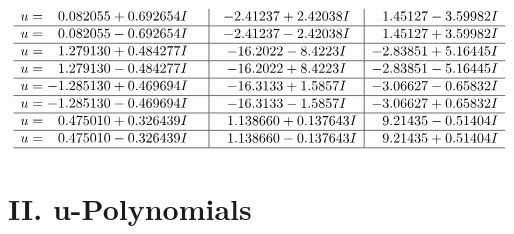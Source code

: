 \documentclass[1p]{elsarticle_modified}
\theoremstyle{definition}
\begin{document}
$$\begin{array}{c|c|c}
\begin{aligned}
u &= \phantom{-}0.082055 + 0.692654 I\end{aligned}
 & -2.41237 + 2.42038 I & \phantom{-}1.45127 - 3.59982 I \\ \hline\begin{aligned}
u &= \phantom{-}0.082055 - 0.692654 I\end{aligned}
 & -2.41237 - 2.42038 I & \phantom{-}1.45127 + 3.59982 I \\ \hline\begin{aligned}
u &= \phantom{-}1.279130 + 0.484277 I\end{aligned}
 & -16.2022 - 8.4223 I & -2.83851 + 5.16445 I \\ \hline\begin{aligned}
u &= \phantom{-}1.279130 - 0.484277 I\end{aligned}
 & -16.2022 + 8.4223 I & -2.83851 - 5.16445 I \\ \hline\begin{aligned}
u &= -1.285130 + 0.469694 I\end{aligned}
 & -16.3133 + 1.5857 I & -3.06627 - 0.65832 I \\ \hline\begin{aligned}
u &= -1.285130 - 0.469694 I\end{aligned}
 & -16.3133 - 1.5857 I & -3.06627 + 0.65832 I \\ \hline\begin{aligned}
u &= \phantom{-}0.475010 + 0.326439 I\end{aligned}
 & \phantom{-}1.138660 + 0.137643 I & \phantom{-}9.21435 - 0.51404 I \\ \hline\begin{aligned}
u &= \phantom{-}0.475010 - 0.326439 I\end{aligned}
 & \phantom{-}1.138660 - 0.137643 I & \phantom{-}9.21435 + 0.51404 I\\
 \hline 
 \end{array}$$\newpage
\newpage\renewcommand{\arraystretch}{1}
\centering \section*{ II. u-Polynomials}
\end{document}
